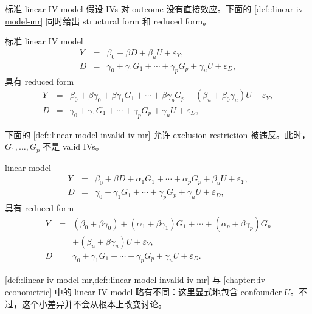 标准 linear IV model 假设 IVs 对 outcome 没有直接效应。下面的 \cref{def::linear-iv-model-mr} 同时给出 structural form 和 reduced form。

\begin{definition}
\label{def::linear-iv-model-mr}
标准 linear IV model
\begin{eqnarray}
Y  &=& \beta_0 +  \beta D + \beta_u U + \varepsilon_Y , \\
D  &=& \gamma_0 +   \gamma_1 G_1 + \cdots + \gamma_p G_p + \gamma_u U + \varepsilon_D ,
\end{eqnarray}
具有 reduced form
\begin{eqnarray}
Y  &=&\beta_0 +  \beta  \gamma_0 + \beta \gamma_1 G_1 + \cdots + \beta  \gamma_p G_p  + (\beta_u + \beta_0 \gamma_u )U + \varepsilon_Y , \\
D  &=& \gamma_0 +  \gamma_1 G_1 + \cdots + \gamma_p G_p + \gamma_u U + \varepsilon_D ,
\end{eqnarray}
\end{definition}



下面的 \cref{def::linear-model-invalid-iv-mr} 允许 exclusion restriction 被违反。此时，$G_1, \ldots, G_p$ 不是 valid IVs。


\begin{definition}
\label{def::linear-model-invalid-iv-mr}
linear model
\begin{eqnarray}
Y  &=& \beta_0 + \beta D + \alpha_1 G_1 + \cdots + \alpha_p G_p  + \beta_u U + \varepsilon_Y ,   \\
D  &=& \gamma_0 + \gamma_1 G_1 + \cdots + \gamma_p G_p + \gamma_u U + \varepsilon_D ,
\end{eqnarray}
具有 reduced form
\begin{eqnarray}
Y  &=& ( \beta_0 +\beta  \gamma_0 ) +  (\alpha_1 + \beta \gamma_1)  G_1 + \cdots + (\alpha_p +  \beta  \gamma_p) G_p \nonumber  \\
&&+  ( \beta_u + \beta \gamma_u )  U + \varepsilon_Y ,   \\
D  &=& \gamma_0 +  \gamma_1 G_1 + \cdots + \gamma_p G_p + \gamma_u U + \varepsilon_D .
\end{eqnarray}
\end{definition}

\cref{def::linear-iv-model-mr,def::linear-model-invalid-iv-mr} 与 \cref{chapter::iv-econometric} 中的 linear IV model 略有不同：这里显式地包含 confounder $U$。不过，这个小差异并不会从根本上改变讨论。


